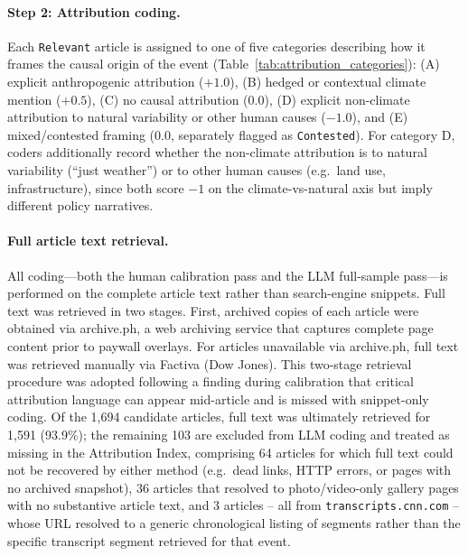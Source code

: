\documentclass[12pt]{article}
\begin{document}
\paragraph{Step 2: Attribution coding.} Each \texttt{Relevant} article
is assigned to one of five categories describing how it frames the
causal origin of the event (Table~\ref{tab:attribution_categories}):
(A) explicit anthropogenic attribution ($+1.0$), (B) hedged or
contextual climate mention ($+0.5$), (C) no causal attribution
($0.0$), (D) explicit non-climate attribution to natural variability
or other human causes ($-1.0$), and (E) mixed/contested framing
($0.0$, separately flagged as \texttt{Contested}). For category D,
coders additionally record whether the non-climate attribution is to
natural variability (``just weather'') or to other human causes
(e.g.\ land use, infrastructure), since both score $-1$ on the
climate-vs-natural axis but imply different policy narratives.

\paragraph{Full article text retrieval.} All coding---both the human
calibration pass and the LLM full-sample pass---is performed on the
complete article text rather than search-engine snippets. Full text
was retrieved in two stages. First, archived copies of each article
were obtained via archive.ph, a web archiving service that captures
complete page content prior to paywall overlays. For articles
unavailable via archive.ph, full text was retrieved manually via
Factiva (Dow Jones). This two-stage retrieval procedure was adopted
following a finding during calibration that critical attribution
language can appear mid-article and is missed with snippet-only
coding. Of the 1,694 candidate articles, full text was ultimately
retrieved for 1,591 (93.9\%); the remaining 103 are excluded from LLM
coding and treated as missing in the Attribution Index, comprising 64
articles for which full text could not be recovered by either method
(e.g.\ dead links, HTTP errors, or pages with no archived snapshot),
36 articles that resolved to photo/video-only gallery pages with no
substantive article text, and 3 articles -- all from
\texttt{transcripts.cnn.com} -- whose URL resolved to a generic
chronological listing of segments rather than the specific transcript
segment retrieved for that event.
\end{document}
